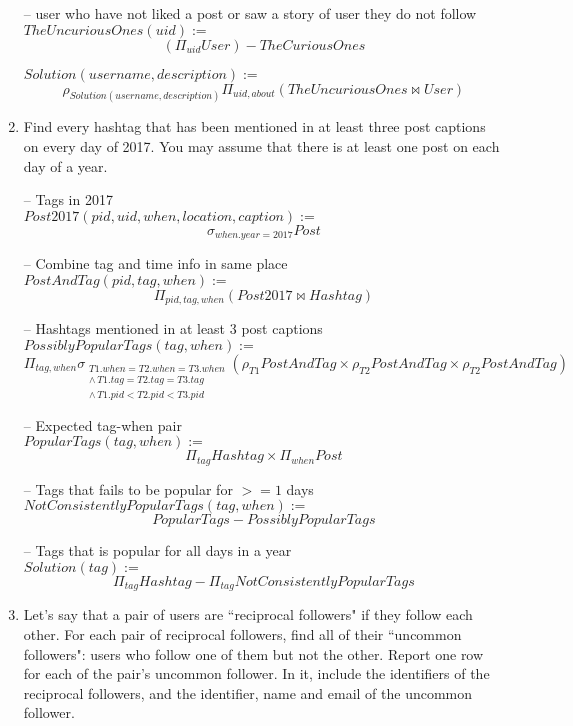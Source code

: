 \documentclass{article}
\newcommand{\var}[1]{\mathit{#1}}
\begin{document}
\begin{enumerate}
{-- user who have not liked a post or saw a story of user they do not follow\\ 
$\var{TheUncuriousOnes}(uid) :=$
\[
    (\Pi_{uid}\var{User}) - \var{TheCuriousOnes}
\]

$\var{Solution}(username, description) :=$
\[
    \rho_{Solution(username, description)}  \Pi_{uid, about} 
    (\var{TheUncuriousOnes} \bowtie \var{User})
\]

} %


\item   %
Find every hashtag that has been mentioned in at least three post captions
on every day of 2017.
You may assume that there is at least one post on each day of a year. 

{\large 



-- Tags in 2017 \\
$\var{Post2017}(pid, uid, when, location, caption) :=$
\[
    \sigma_{when.year=2017} Post
\]

-- Combine tag and time info in same place \\ 
$\var{PostAndTag}(pid, tag, when) :=$
\[
    \Pi_{pid, tag, when} (\var{Post2017} \bowtie \var{Hashtag})
\]

-- Hashtags mentioned in at least 3 post captions \\ 
$\var{PossiblyPopularTags}(tag, when) :=$
\[
    \Pi_{tag, when}
    \sigma_{
        \substack{T1.when=T2.when=T3.when \\ 
        \land\, T1.tag=T2.tag=T3.tag  \\
        \land\, T1.pid < T2.pid < T3.pid }}
    (\rho_{T1} \var{PostAndTag} \times \rho_{T2} \var{PostAndTag} \times \rho_{T2} \var{PostAndTag})
\]

-- Expected tag-when pair \\
$\var{PopularTags}(tag, when) :=$
\[
    \Pi_{tag} \var{Hashtag} \times \Pi_{when} \var{Post}
\]

-- Tags that fails to be popular for $>=1$ days  \\ 
$\var{NotConsistentlyPopularTags}(tag, when) :=$
\[
    PopularTags - PossiblyPopularTags
\]

-- Tags that is popular for all days in a year \\
$\var{Solution}(tag) :=$
\[
    \Pi_{tag} \var{Hashtag} - \Pi_{tag} \var{NotConsistentlyPopularTags}
\]


}


\item   %
Let's say that a pair of users are ``reciprocal followers" if they follow each other. 
For each pair of reciprocal followers, 
find all of their ``uncommon followers": 
users who follow one of them but not the other. 
Report one row for each of the pair's uncommon follower.
In it, include
the identifiers of the reciprocal followers,
and the identifier, name and email of the uncommon follower. 


\end{enumerate}
\end{document}
